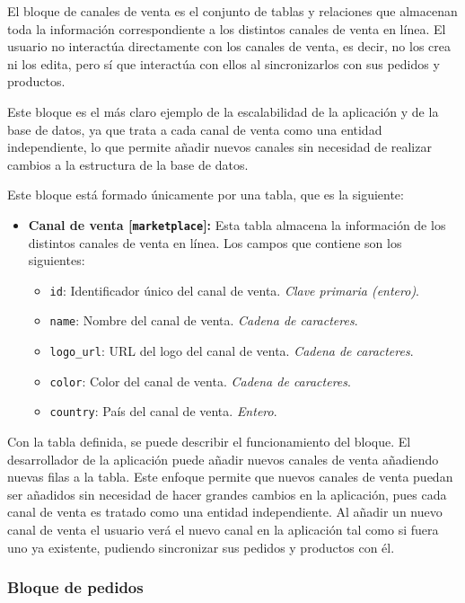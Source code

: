 El bloque de canales de venta es el conjunto de tablas y relaciones que almacenan toda la información correspondiente a los distintos canales de venta en línea. El usuario no interactúa directamente con los canales de venta, es decir, no los crea ni los edita, pero sí que interactúa con ellos al sincronizarlos con sus pedidos y productos.

Este bloque es el más claro ejemplo de la escalabilidad de la aplicación y de la base de datos, ya que trata a cada canal de venta como una entidad independiente, lo que permite añadir nuevos canales sin necesidad de realizar cambios a la estructura de la base de datos.

Este bloque está formado únicamente por una tabla, que es la siguiente:
\begin{itemize}
    \item \textbf{Canal de venta [\texttt{marketplace}]:} Esta tabla almacena la información de los distintos canales de venta en línea. Los campos que contiene son los siguientes:
          \begin{itemize}
              \item \texttt{id}: Identificador único del canal de venta. \textit{Clave primaria (entero)}.
              \item \texttt{name}: Nombre del canal de venta. \textit{Cadena de caracteres}.
              \item \texttt{logo\_url}: URL del logo del canal de venta. \textit{Cadena de caracteres}.
              \item \texttt{color}: Color del canal de venta. \textit{Cadena de caracteres}.
              \item \texttt{country}: País del canal de venta. \textit{Entero}.
          \end{itemize}
\end{itemize}

Con la tabla definida, se puede describir el funcionamiento del bloque. El desarrollador de la aplicación puede añadir nuevos canales de venta añadiendo nuevas filas a la tabla. Este enfoque permite que nuevos canales de venta puedan ser añadidos sin necesidad de hacer grandes cambios en la aplicación, pues cada canal de venta es tratado como una entidad independiente. Al añadir un nuevo canal de venta el usuario verá el nuevo canal en la aplicación tal como si fuera uno ya existente, pudiendo sincronizar sus pedidos y productos con él.

\subsubsection{Bloque de pedidos}

